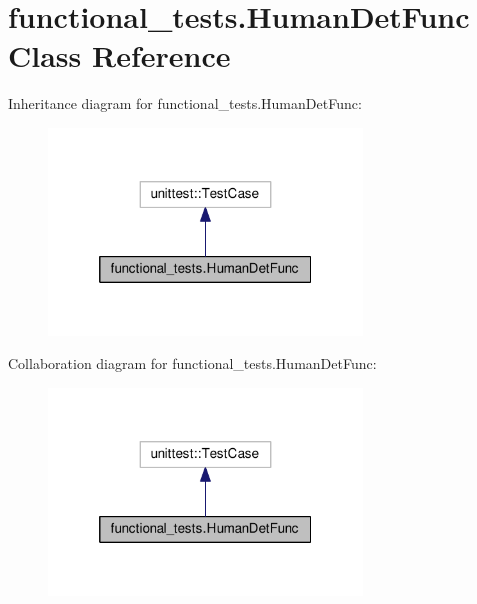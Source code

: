 \hypertarget{classfunctional__tests_1_1HumanDetFunc}{\section{functional\-\_\-tests.\-Human\-Det\-Func Class Reference}
\label{classfunctional__tests_1_1HumanDetFunc}
}


Inheritance diagram for functional\-\_\-tests.\-Human\-Det\-Func\-:
\nopagebreak
\begin{figure}[H]
\begin{center}
\leavevmode
\includegraphics[width=236pt]{classfunctional__tests_1_1HumanDetFunc__inherit__graph}
\end{center}
\end{figure}


Collaboration diagram for functional\-\_\-tests.\-Human\-Det\-Func\-:
\nopagebreak
\begin{figure}[H]
\begin{center}
\leavevmode
\includegraphics[width=236pt]{classfunctional__tests_1_1HumanDetFunc__coll__graph}
\end{center}
\end{figure}
